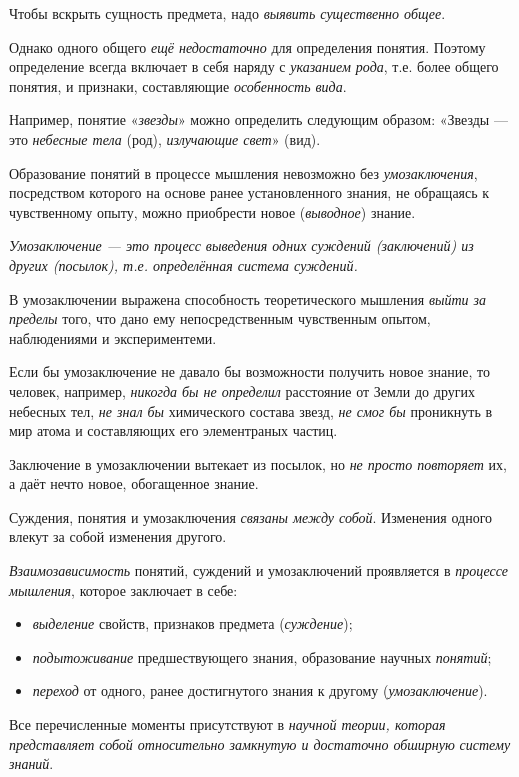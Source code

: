 \documentclass[a4paper,14pt,russian]{extreport}
\begin{document}
Чтобы вскрыть сущность предмета, надо \emph{выявить существенно общее}.

Однако одного общего \emph{ещё недостаточно} для определения понятия. Поэтому определение всегда включает в себя наряду с \emph{указанием рода}, т.е. более общего понятия, и признаки, составляющие \emph{особенность вида}.

Например, понятие «\emph{звезды}» можно определить следующим образом: «Звезды --- это \emph{небесные тела} (род), \emph{излучающие свет}» (вид).

Образование понятий в процессе мышления невозможно без \emph{умозаключения}, посредством которого на основе ранее установленного знания, не обращаясь к чувственному опыту, можно приобрести новое (\emph{выводное}) знание.

\emph{Умозаключение --- это процесс выведения одних суждений (заключений) из других (посылок), т.е. определённая система суждений.}

В умозаключении выражена способность теоретического мышления \emph{выйти за пределы} того, что дано ему непосредственным чувственным опытом, наблюдениями и экспериментеми.

Если бы умозаключение не давало бы возможности получить новое знание, то человек, например, \emph{никогда бы не определил} расстояние от Земли до других небесных тел, \emph{не знал бы} химического состава звезд, \emph{не смог бы} проникнуть в мир атома и составляющих его элементраных частиц.

Заключение в умозаключении вытекает из посылок, но \emph{не просто повторяет} их, а даёт нечто новое, обогащенное знание.

Суждения, понятия и умозаключения \emph{связаны между собой}. Изменения одного влекут за собой изменения другого.

\emph{Взаимозависимость} понятий, суждений и умозаключений проявляется в \emph{процессе мышления}, которое заключает в себе:

\begin{itemize}
\item \emph{выделение} свойств, признаков предмета (\emph{суждение});
\item \emph{подытоживание} предшествующего знания, образование научных \emph{понятий};
\item \emph{переход} от одного, ранее достигнутого знания к другому (\emph{умозаключение}).
\end{itemize}

Все перечисленные моменты присутствуют в \emph{научной теории, которая представляет собой относительно замкнутую и достаточно обширную} \emph{систему знаний}.
\end{document}
